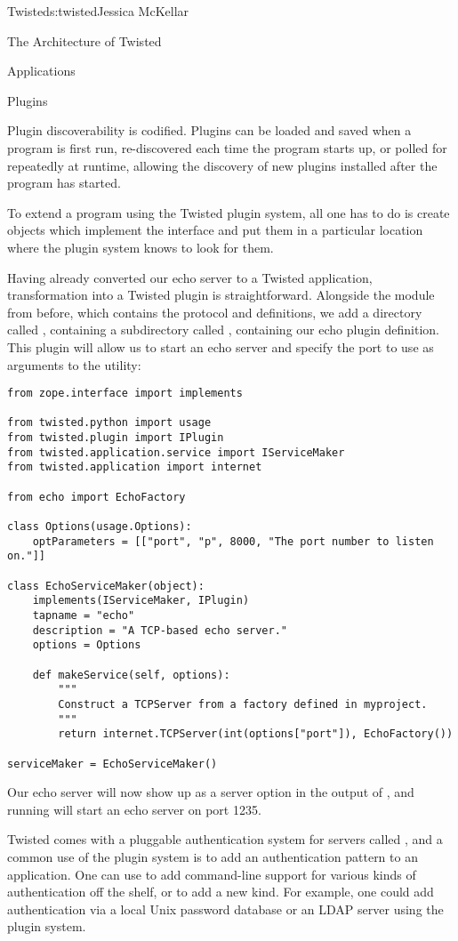 \begin{aosachapter}{Twisted}{s:twisted}{Jessica McKellar}
\begin{aosasect1}{The Architecture of Twisted}
\begin{aosasect2}{Applications}
\begin{aosasect3}{Plugins}
\begin{aosaenumerate}
\item Plugin discoverability is codified. Plugins can be loaded and
  saved when a program is first run, re-discovered each time the
  program starts up, or polled for repeatedly at runtime, allowing the
  discovery of new plugins installed after the program has started.

\end{aosaenumerate}

To extend a program using the Twisted plugin system, all one has to do is
create objects which implement the  interface and put them
in a particular location where the plugin system knows to look for them.

Having already converted our echo server to a Twisted application,
transformation into a Twisted plugin is straightforward. Alongside the
 module from before, which contains the 
protocol and  definitions, we add a directory called
, containing a subdirectory called ,
containing our echo plugin definition. This plugin will allow us to start an
echo server and specify the port to use as arguments to the  utility:

\begin{verbatim}
from zope.interface import implements

from twisted.python import usage
from twisted.plugin import IPlugin
from twisted.application.service import IServiceMaker
from twisted.application import internet

from echo import EchoFactory

class Options(usage.Options):
    optParameters = [["port", "p", 8000, "The port number to listen on."]]

class EchoServiceMaker(object):
    implements(IServiceMaker, IPlugin)
    tapname = "echo"
    description = "A TCP-based echo server."
    options = Options

    def makeService(self, options):
        """
        Construct a TCPServer from a factory defined in myproject.
        """
        return internet.TCPServer(int(options["port"]), EchoFactory())

serviceMaker = EchoServiceMaker()
\end{verbatim}

Our echo server will now show up as a server option in the output of
, and running 
will start an echo server on port 1235.

Twisted comes with a pluggable authentication system for servers called
, and a common use of the plugin system is to add an
authentication pattern to an application. One can use 
 to add command-line support for various kinds of
authentication off the shelf, or to add a new kind. For example, one could add
authentication via a local Unix password database or an LDAP server using the
plugin system.


\end{aosasect3}
\end{aosasect2}
\end{aosasect1}
\end{aosachapter}
